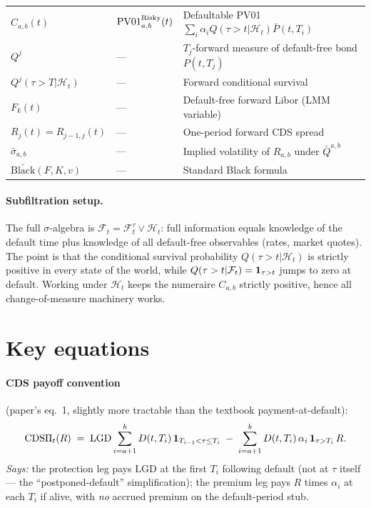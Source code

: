 \documentclass[11pt,a4paper]{article}
\begin{document}
\begin{tabular}{@{}p{3cm}p{3.5cm}p{8.5cm}@{}}
$C_{a,b}(t)$                & $\mathrm{PV01}^{\text{Risky}}_{a,b}(t)$ & Defaultable PV01 $\sum_i \alpha_i Q(\tau{>}t|\mathcal{H}_t)\bar P(t, T_i)$ \\
$Q^j$                       & ---                            & $T_j$-forward measure of default-free bond $P(t, T_j)$ \\
$Q^j(\tau > T | \mathcal{H}_t)$ & ---                        & Forward conditional survival \\
$F_k(t)$                    & ---                            & Default-free forward Libor (LMM variable) \\
$R_j(t) = R_{j-1,j}(t)$     & ---                            & One-period forward CDS spread \\
$\bar\sigma_{a,b}$          & ---                            & Implied volatility of $R_{a,b}$ under $\bar Q^{a,b}$ \\
$\bar{\text{Black}}(F, K, v)$ & ---                          & Standard Black formula \\
\bottomrule
\end{tabular}

\paragraph{Subfiltration setup.} The full $\sigma$-algebra is
$\mathcal{F}_t = \mathcal{F}^\tau_t \vee \mathcal{H}_t$: full
information equals knowledge of the default time plus knowledge of
all default-free observables (rates, market quotes). The point is
that the conditional survival probability $Q(\tau > t | \mathcal{H}_t)$
is strictly positive in every state of the world, while
$Q(\tau > t | \mathcal{F}_t) = \mathbf{1}_{\tau > t}$ jumps to zero at
default. Working under $\mathcal{H}_t$ keeps the numeraire $C_{a,b}$
strictly positive, hence all change-of-measure machinery works.

\section{Key equations}

\paragraph{CDS payoff convention} (paper's eq.~1, slightly more
tractable than the textbook payment-at-default):
\begin{equation}\label{eq:cdsmm-payoff}
  \text{CDS}\Pi_t(R) \;=\; \mathrm{LGD} \sum_{i=a+1}^{b} D(t, T_i)\, \mathbf{1}_{T_{i-1} < \tau \le T_i}
                       \;-\; \sum_{i=a+1}^{b} D(t, T_i)\, \alpha_i\, \mathbf{1}_{\tau > T_i}\, R.
\end{equation}
\textit{Says:} the protection leg pays $\mathrm{LGD}$ at the first
$T_i$ following default (not at $\tau$ itself --- the
``postponed-default'' simplification); the premium leg pays $R$
times $\alpha_i$ at each $T_i$ if alive, with \emph{no} accrued
premium on the default-period stub.
\end{document}
